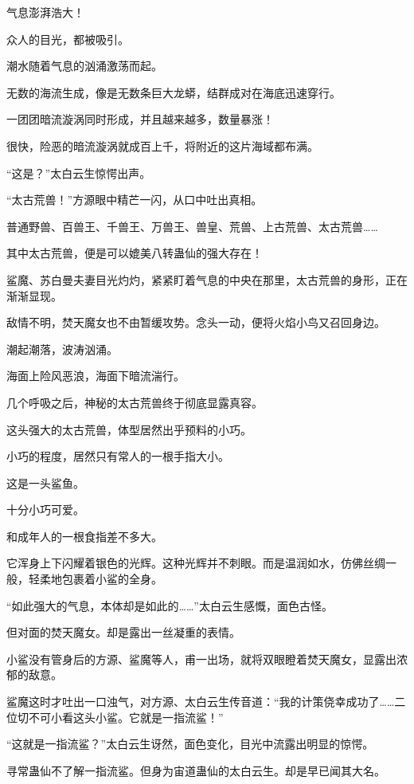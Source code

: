 
\begin{this_body}

气息澎湃浩大！

众人的目光，都被吸引。

潮水随着气息的汹涌激荡而起。

无数的海流生成，像是无数条巨大龙蟒，结群成对在海底迅速穿行。

一团团暗流漩涡同时形成，并且越来越多，数量暴涨！

很快，险恶的暗流漩涡就成百上千，将附近的这片海域都布满。

“这是？”太白云生惊愕出声。

“太古荒兽！”方源眼中精芒一闪，从口中吐出真相。

普通野兽、百兽王、千兽王、万兽王、兽皇、荒兽、上古荒兽、太古荒兽……

其中太古荒兽，便是可以媲美八转蛊仙的强大存在！

鲨魔、苏白曼夫妻目光灼灼，紧紧盯着气息的中央在那里，太古荒兽的身形，正在渐渐显现。

敌情不明，焚天魔女也不由暂缓攻势。念头一动，便将火焰小鸟又召回身边。

潮起潮落，波涛汹涌。

海面上险风恶浪，海面下暗流湍行。

几个呼吸之后，神秘的太古荒兽终于彻底显露真容。

这头强大的太古荒兽，体型居然出乎预料的小巧。

小巧的程度，居然只有常人的一根手指大小。

这是一头鲨鱼。

十分小巧可爱。

和成年人的一根食指差不多大。

它浑身上下闪耀着银色的光辉。这种光辉并不刺眼。而是温润如水，仿佛丝绸一般，轻柔地包裹着小鲨的全身。

“如此强大的气息，本体却是如此的……”太白云生感慨，面色古怪。

但对面的焚天魔女。却是露出一丝凝重的表情。

小鲨没有管身后的方源、鲨魔等人，甫一出场，就将双眼瞪着焚天魔女，显露出浓郁的敌意。

鲨魔这时才吐出一口浊气，对方源、太白云生传音道：“我的计策侥幸成功了……二位切不可小看这头小鲨。它就是一指流鲨！”

“这就是一指流鲨？”太白云生讶然，面色变化，目光中流露出明显的惊愕。

寻常蛊仙不了解一指流鲨。但身为宙道蛊仙的太白云生。却是早已闻其大名。


\end{this_body}

